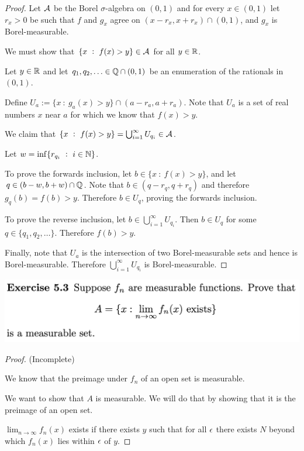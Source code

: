 \begin{proof}
  Let $\mathcal A$ be the Borel $\sigma$-algebra on $(0, 1)$ and for every $x \in (0, 1)$ let $r_x > 0$ be such
  that $f$ and $g_x$ agree on $(x - r_x, x + r_x) \cap (0, 1)$, and $g_x$ is Borel-measurable.

  We must show that $\{x ~:~ f(x) > y\} \in \mathcal A$ for all $y \in \mathbb{R}$.

  Let $y \in \mathbb{R}$ and let $q_1, q_2, \ldots \in \mathbb{Q} \cap (0, 1)$ be an enumeration of the rationals in $(0, 1)$.

  Define $U_{a} := \{x ~:~ g_{a}(x) > y\} \cap (a - r_{a}, a + r_{a})$. Note that $U_a$ is a set of real
  numbers $x$ near $a$ for which we know that $f(x) > y$.

  We claim that $\{x ~:~ f(x) > y\} = \bigcup_{i=1}^\infty U_{q_i} \in \mathcal A$.

  Let $w = \inf \{r_{q_i} ~:~ i \in \mathbb{N} \}$.

  To prove the forwards inclusion, let $b \in \{x ~:~ f(x) > y\}$, and let $q \in (b - w, b + w) \cap \mathbb{Q}$. Note
  that $b \in (q - r_q, q + r_q)$ and therefore $g_q(b) = f(b) > y$. Therefore $b \in U_q$, proving the
  forwards inclusion.

  To prove the reverse inclusion, let $b \in \bigcup_{i=1}^\infty U_{q_i}$. Then $b \in U_q$ for
  some $q \in \{q_1, q_2, \ldots\}$. Therefore $f(b) > y$.

  Finally, note that $U_a$ is the intersection of two Borel-measurable sets and hence is Borel-measurable.
  Therefore $\bigcup_{i=1}^\infty U_{q_i}$ is Borel-measurable.
\end{proof}

\newpage
\begin{mdframed}
\includegraphics[width=400pt]{img/analysis--berkeley-202a-hw06-aaf5.png}
\end{mdframed}

\begin{proof}

  (Incomplete)

  We know that the preimage under $f_n$ of an open set is measurable.

  We want to show that $A$ is measurable. We will do that by showing that it is the preimage of an open set.

  $\lim_{n \to \infty} f_n(x)$ exists if there exists $y$ such that for all $\epsilon$ there exists $N$ beyond
  which $f_n(x)$ lies within $\epsilon$ of $y$.
\end{proof}

